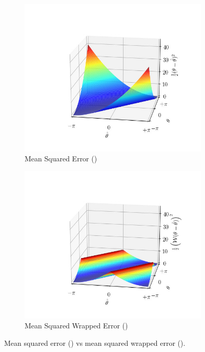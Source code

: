 \renewcommand{\captiontitle}{Mean squared error (\MSE{}) vs mean squared wrapped error (\MSWE{})}
\begin{figure}
\begin{center}
\begin{subfigure}{0.48\textwidth}
\includegraphics[clip, trim=90 30 50 70,width=1.0\textwidth]{./data/phase-loss.png}
\caption{Mean Squared Error (\MSE{})}
\end{subfigure}
\begin{subfigure}{0.48\textwidth}
\includegraphics[clip, trim=90 30 50 70,width=1.0\textwidth]{./data/wrapped-phase-loss.png}
\caption{Mean Squared Wrapped Error (\MSWE{})}
\end{subfigure}
\caption[\captiontitle]{\captiontitle{}.}
\label{fig:wrapped-phase-loss}
\end{center}
\end{figure}

